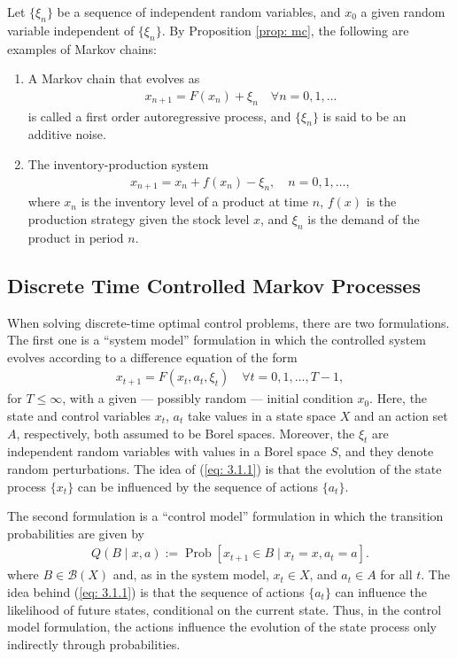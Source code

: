 \documentclass[\topdir/lecture\_notes.tex]{subfiles}
\begin{document}
\begin{example}
Let $\{\xi_{n}\}$ be a sequence of independent random variables, and $x_{0}$ a given random variable independent of $\{\xi_{n}\}$. By Proposition \ref{prop: mc}, the following are examples of Markov chains:
\begin{enumerate}[label=(\alph*)]
\item  A Markov chain that evolves as
\begin{align*}
x_{n+1}=F(x_{n})+\xi_{n} \quad \forall n=0,1, \ldots
\end{align*}
is called a first order autoregressive process, and $\{\xi_{n}\}$ is said to be an additive noise. 
\item The inventory-production system
\begin{align*}
x_{n+1}=x_{n}+f(x_{n})-\xi_{n},\quad n=0,1, \ldots,
\end{align*}
where $x_{n}$ is the inventory level of a product at time $n$, $f(x)$ is the production strategy given the stock level $x$, and $\xi_{n}$ is the demand of the product in period $n$.
\end{enumerate}
\end{example}

\subsection{Discrete Time Controlled Markov Processes}
When solving discrete-time optimal control problems, there are two formulations. The first one is a ``system model'' formulation in which the controlled system evolves according to a difference equation of the form
\begin{align}
x_{t+1}=F(x_{t}, a_{t}, \xi_{t}) \quad \forall t=0,1, \ldots, T-1, \label{eq: 3.1.1}
\end{align}
for $T \leq \infty$, with a given --- possibly random --- initial condition $x_{0}$. Here, the state and control variables $x_{t}$, $a_{t}$ take values in a state space $X$ and an action set $A$, respectively, both assumed to be Borel spaces. Moreover, the $\xi_{t}$ are independent random variables with values in a Borel space $S$, and they denote random perturbations. The idea of (\ref{eq: 3.1.1}) is that the evolution of the state process $\{x_t\}$ can be influenced by the sequence of actions $\{a_t\}$. 

The second formulation is a ``control model'' formulation in which the transition probabilities are given by
\begin{align}
Q(B \mid x, a):=\operatorname{Prob}\left[x_{t+1} \in B \mid x_{t}=x, a_{t}=a\right]. \label{eq: 3.1.4}
\end{align}
where  $B \in \mathcal{B}(X)$ and, as in the system model, $x_{t}\in X$, and $a_{t}\in A$ for all $t$. The idea behind (\ref{eq: 3.1.1}) is that the sequence of actions $\{a_t\}$ can influence the likelihood of future states, conditional on the current state. Thus, in the control model formulation, the actions influence the evolution of the state process only indirectly through probabilities.
\end{document}
